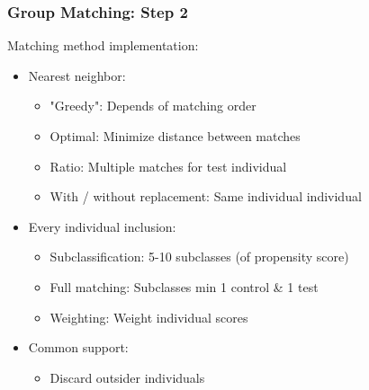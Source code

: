\documentclass[xcolor=table]{beamer}
\begin{document}
\begin{frame}
	\frametitle{Group Matching: Step 2}
	Matching method implementation:
	\begin{itemize}[label=$\bullet$]
		\item Nearest neighbor:
		\begin{itemize}[label=$-$]
			\item "Greedy": Depends of matching order
			\item Optimal: Minimize distance between matches
			\item Ratio: Multiple matches for test individual
			\item With / without replacement: Same individual individual
		\end{itemize}
		\item Every individual inclusion:
		\begin{itemize}[label=$-$]
			\item Subclassification: 5-10 subclasses (of propensity score)
			\item Full matching: Subclasses min 1 control \& 1 test
			\item Weighting: Weight individual scores
		\end{itemize}
		\item Common support:
		\begin{itemize}[label=$-$]
			\item Discard outsider individuals
		\end{itemize}
	\end{itemize}
\end{frame}

\end{document}
